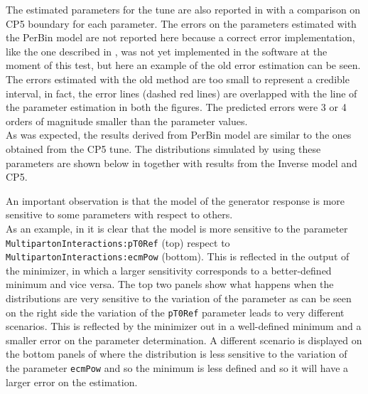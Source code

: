 \noindent The estimated parameters for the tune are also reported in  with a comparison on CP5 boundary for each parameter. The errors on the parameters estimated with the PerBin model are not reported here because a correct error implementation, like the one described in , was not yet implemented in the software at the moment of this test, but here an example of the old error estimation can be seen. The errors estimated with the old method are too small to represent a credible interval, in fact, the error lines (dashed red lines) are overlapped with the line of the parameter estimation in both the figures. The predicted errors were 3 or 4 orders of magnitude smaller than the parameter values. 
\\
As was expected, the results derived from PerBin model are similar to the ones obtained from the CP5 tune. The distributions simulated by using these  parameters are shown below  in  together with results from the Inverse model and CP5.


\medskip

An important observation is that the model of the generator response is more sensitive to some parameters with respect to others.
\\
As an example, in  it is clear that the model is more sensitive to the parameter \texttt{MultipartonInteractions:pT0Ref} (top) respect to 
\texttt{MultipartonInteractions:}\-\texttt{ecmPow} (bottom). This is reflected in the output of the minimizer, in which a larger sensitivity corresponds to a better-defined minimum and vice versa. The top two panels show what happens when the distributions are very sensitive to the variation of the parameter as can be seen on the right side the variation of the \texttt{pT0Ref} parameter leads to very different scenarios. This is reflected by the minimizer out in a well-defined minimum and a smaller error on the parameter determination. A different scenario is displayed on the bottom panels of  where the distribution is less sensitive to the variation of the parameter \texttt{ecmPow} and so the minimum is less defined and so it will have a larger error on the estimation.

